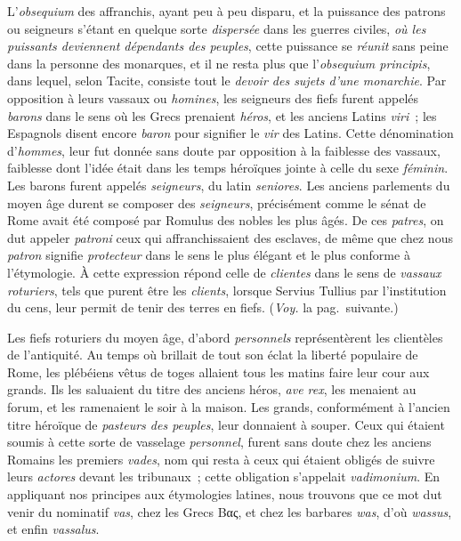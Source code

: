 \documentclass[french,twoside]{book} %
\begin{document}
L’{\itshape obsequium} des affranchis, ayant peu à peu disparu, et la puissance des patrons ou seigneurs s’étant en quelque sorte {\itshape dispersée} dans les guerres civiles, {\itshape où les puissants deviennent dépendants des peuples}, cette puissance se {\itshape réunit} sans peine dans la personne des monarques, et il ne resta plus que  l’\emph{{\itshape obsequium principis}}, dans lequel, selon Tacite, consiste tout le \emph{{\itshape devoir des sujets d’une monarchie}}. Par opposition à leurs vassaux ou {\itshape homines}, les seigneurs des fiefs furent appelés {\itshape barons} dans le sens où les Grecs prenaient {\itshape héros}, et les anciens Latins {\itshape viri} ; les Espagnols disent encore {\itshape baron} pour signifier le {\itshape vir} des Latins. Cette dénomination d’{\itshape hommes}, leur fut donnée sans doute par opposition à la faiblesse des vassaux, faiblesse dont l’idée était dans les temps héroïques jointe à celle du sexe {\itshape féminin}. Les barons furent appelés {\itshape seigneurs}, du latin {\itshape seniores}. Les anciens parlements du moyen âge durent se composer des {\itshape seigneurs}, précisément comme le sénat de Rome avait été composé par Romulus des nobles les plus âgés. De ces {\itshape patres}, on dut appeler {\itshape patroni} ceux qui affranchissaient des esclaves, de même que chez nous {\itshape patron} signifie {\itshape protecteur} dans le sens le plus élégant et le plus conforme à l’étymologie. À cette expression répond celle de {\itshape clientes} dans le sens de {\itshape vassaux roturiers}, tels que purent être les {\itshape clients}, lorsque Servius Tullius par l’institution du cens, leur permit de tenir des terres en fiefs. ({\itshape Voy.} la pag. suivante.)\par
Les fiefs roturiers du moyen âge, d’abord {\itshape personnels} représentèrent les clientèles de l’antiquité. Au temps où brillait de tout son éclat la liberté populaire de Rome, les plébéiens vêtus de toges allaient tous les matins faire leur cour aux grands. Ils les saluaient du titre des anciens héros, {\itshape ave rex}, les menaient au forum, et les ramenaient le soir à la  maison. Les grands, conformément à l’ancien titre héroïque de {\itshape pasteurs des peuples}, leur donnaient à souper. Ceux qui étaient soumis à cette sorte de vasselage {\itshape personnel}, furent sans doute chez les anciens Romains les premiers {\itshape vades}, nom qui resta à ceux qui étaient obligés de suivre leurs {\itshape actores} devant les tribunaux ; cette obligation s’appelait {\itshape vadimonium}. En appliquant nos principes aux étymologies latines, nous trouvons que ce mot dut venir du nominatif {\itshape vas}, chez les Grecs Βας, et chez les barbares {\itshape was}, d’où {\itshape wassus}, et enfin {\itshape vassalus}.\par
\end{document}
